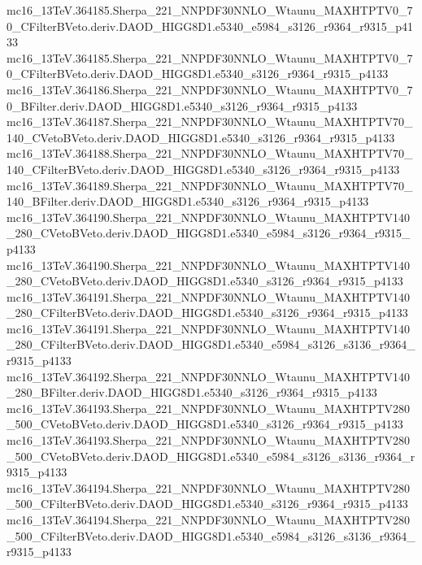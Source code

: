 \begin{footnotesize}
mc16\_13TeV.364185.Sherpa\_221\_NNPDF30NNLO\_Wtaunu\_MAXHTPTV0\_70\_CFilterBVeto.deriv.DAOD\_HIGG8D1.e5340\_e5984\_s3126\_r9364\_r9315\_p4133 \\
mc16\_13TeV.364185.Sherpa\_221\_NNPDF30NNLO\_Wtaunu\_MAXHTPTV0\_70\_CFilterBVeto.deriv.DAOD\_HIGG8D1.e5340\_s3126\_r9364\_r9315\_p4133 \\
mc16\_13TeV.364186.Sherpa\_221\_NNPDF30NNLO\_Wtaunu\_MAXHTPTV0\_70\_BFilter.deriv.DAOD\_HIGG8D1.e5340\_s3126\_r9364\_r9315\_p4133 \\
mc16\_13TeV.364187.Sherpa\_221\_NNPDF30NNLO\_Wtaunu\_MAXHTPTV70\_140\_CVetoBVeto.deriv.DAOD\_HIGG8D1.e5340\_s3126\_r9364\_r9315\_p4133 \\
mc16\_13TeV.364188.Sherpa\_221\_NNPDF30NNLO\_Wtaunu\_MAXHTPTV70\_140\_CFilterBVeto.deriv.DAOD\_HIGG8D1.e5340\_s3126\_r9364\_r9315\_p4133 \\
mc16\_13TeV.364189.Sherpa\_221\_NNPDF30NNLO\_Wtaunu\_MAXHTPTV70\_140\_BFilter.deriv.DAOD\_HIGG8D1.e5340\_s3126\_r9364\_r9315\_p4133 \\
mc16\_13TeV.364190.Sherpa\_221\_NNPDF30NNLO\_Wtaunu\_MAXHTPTV140\_280\_CVetoBVeto.deriv.DAOD\_HIGG8D1.e5340\_e5984\_s3126\_r9364\_r9315\_p4133 \\
mc16\_13TeV.364190.Sherpa\_221\_NNPDF30NNLO\_Wtaunu\_MAXHTPTV140\_280\_CVetoBVeto.deriv.DAOD\_HIGG8D1.e5340\_s3126\_r9364\_r9315\_p4133 \\
mc16\_13TeV.364191.Sherpa\_221\_NNPDF30NNLO\_Wtaunu\_MAXHTPTV140\_280\_CFilterBVeto.deriv.DAOD\_HIGG8D1.e5340\_s3126\_r9364\_r9315\_p4133 \\
mc16\_13TeV.364191.Sherpa\_221\_NNPDF30NNLO\_Wtaunu\_MAXHTPTV140\_280\_CFilterBVeto.deriv.DAOD\_HIGG8D1.e5340\_e5984\_s3126\_s3136\_r9364\_r9315\_p4133 \\
mc16\_13TeV.364192.Sherpa\_221\_NNPDF30NNLO\_Wtaunu\_MAXHTPTV140\_280\_BFilter.deriv.DAOD\_HIGG8D1.e5340\_s3126\_r9364\_r9315\_p4133 \\
mc16\_13TeV.364193.Sherpa\_221\_NNPDF30NNLO\_Wtaunu\_MAXHTPTV280\_500\_CVetoBVeto.deriv.DAOD\_HIGG8D1.e5340\_s3126\_r9364\_r9315\_p4133 \\
mc16\_13TeV.364193.Sherpa\_221\_NNPDF30NNLO\_Wtaunu\_MAXHTPTV280\_500\_CVetoBVeto.deriv.DAOD\_HIGG8D1.e5340\_e5984\_s3126\_s3136\_r9364\_r9315\_p4133 \\
mc16\_13TeV.364194.Sherpa\_221\_NNPDF30NNLO\_Wtaunu\_MAXHTPTV280\_500\_CFilterBVeto.deriv.DAOD\_HIGG8D1.e5340\_s3126\_r9364\_r9315\_p4133 \\
mc16\_13TeV.364194.Sherpa\_221\_NNPDF30NNLO\_Wtaunu\_MAXHTPTV280\_500\_CFilterBVeto.deriv.DAOD\_HIGG8D1.e5340\_e5984\_s3126\_s3136\_r9364\_r9315\_p4133 \\

\end{footnotesize}
